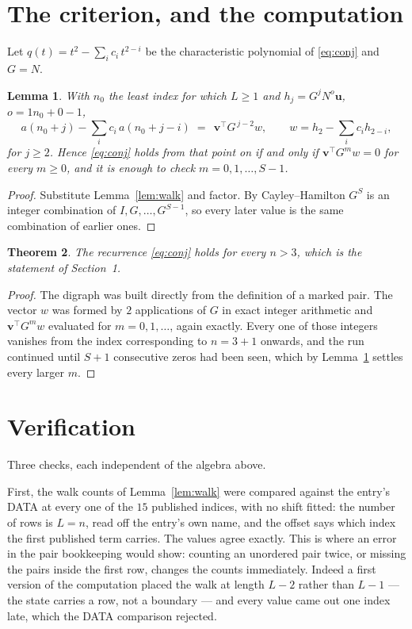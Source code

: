 \documentclass[11pt,a4paper]{article}
\theoremstyle{plain}
\newtheorem{theorem}{Theorem}
\newtheorem{lemma}[theorem]{Lemma}
\theoremstyle{definition}
\begin{document}
\section{The criterion, and the computation}

Let $q(t)=t^{2}-\sum_i c_i\,t^{2-i}$ be the characteristic polynomial of
\eqref{eq:conj} and $G=N$.

\begin{lemma}\label{lem:crit}
With $n_0$ the least index for which $L\ge1$ and $h_j=G^{j}N^{o}\mathbf{u}$,
$o=1n_0+0-1$,
\[
a(n_0+j)-\sum_i c_i\,a(n_0+j-i)\;=\;\,\mathbf{v}^{\!\top}G^{\,j-2}w,
\qquad w=h_{2}-\sum_i c_i h_{2-i},
\]
for $j\ge2$. Hence \eqref{eq:conj} holds from that point on if and only if
$\mathbf{v}^{\!\top}G^{m}w=0$ for every $m\ge0$, and it is enough to check
$m=0,1,\dots,S-1$.
\end{lemma}

\begin{proof}
Substitute Lemma~\ref{lem:walk} and factor. By Cayley--Hamilton $G^{S}$ is an integer
combination of $I,G,\dots,G^{S-1}$, so every later value is the same combination of earlier
ones.
\end{proof}

\begin{theorem}
The recurrence \eqref{eq:conj} holds for every $n>3$, which is the statement of
Section~1.
\end{theorem}

\begin{proof}
The digraph was built directly from the definition of a marked pair. The vector $w$ was
formed by $2$ applications of $G$ in exact integer arithmetic and
$\mathbf{v}^{\!\top}G^{m}w$ evaluated for $m=0,1,\dots$, again exactly. Every one of
those integers vanishes from the index corresponding to $n=3+1$ onwards, and the run
continued until $S+1$ consecutive zeros had been seen, which by Lemma~\ref{lem:crit}
settles every larger $m$.
\end{proof}

\section{Verification}

Three checks, each independent of the algebra above.

First, the walk counts of Lemma~\ref{lem:walk} were compared against the entry's DATA at
every one of the $15$ published indices, with no shift fitted: the number of rows is
$L=n$, read off the entry's own name, and the offset says which index the first
published term carries. The values agree exactly. This is where an error in the pair
bookkeeping would show: counting an unordered pair twice, or missing the pairs inside the
first row, changes the counts immediately. Indeed a first version of the computation
placed the walk at length $L-2$ rather than $L-1$ --- the state carries a row, not a
boundary --- and every value came out one index late, which the DATA comparison rejected.
\end{document}
